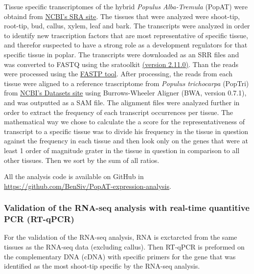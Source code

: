 \documentclass[
]{article}
\begin{document}
Tissue specific transcriptomes of the hybrid \emph{Populus Alba-Tremula}
(PopAT) were obtaind from
\href{https://www.ncbi.nlm.nih.gov/bioproject/?term=(Populus\%20tremula\%20x\%20alba,\%20clone\%20717\%20Transcriptome)\%20AND\%20bioproject_sra\%5Bfilter\%5D\%20NOT\%20bioproject_gap\%5Bfilter\%5D}{NCBI's
SRA site}. The tissues that were analyzed were shoot-tip, root-tip, bud,
callus, xylem, leaf and bark. The transcripts were analyzed in order to
identify new trascription factors that are most representative of
specific tissue, and therefor suspected to have a strong role as a
development regulators for that specific tissue in poplar. The
transcripts were downloaded as an SRR files and was converted to FASTQ
using the sratoolkit
\href{https://trace.ncbi.nlm.nih.gov/Traces/sra/sra.cgi?view=software}{(version
2.11.0)}. Than the reads were processed using the
\href{https://github.com/OpenGene/fastp}{FASTP tool}. After processing,
the reads from each tissue were aligned to a reference trascriptome from
\emph{Populus trichocarpa} (PopTri) from
\href{https://www.ncbi.nlm.nih.gov/datasets/genomes/?txid=3689\&term=Populus\&utm_source=gquery\&utm_medium=referral\&utm_campaign=:assemb}{NCBI's
Datasets site} using Burrows-Wheeler Aligner (BWA, version 0.7.1), and
was outputted as a SAM file. The alignment files were analyzed further
in order to extract the frequency of each transcript occurrences per
tissue. The mathematical way we chose to calculate the a score for the
representativeness of transcript to a specific tissue was to divide his
frequency in the tissue in question against the frequency in each tissue
and then look only on the genes that were at least 1 order of magnitude
grater in the tissue in question in comparison to all other tissues.
Then we sort by the sum of all ratios.

All the analysis code is available on GitHub in
\url{https://github.com/BenSiv/PopAT-expression-analysis}.

\hypertarget{validation-of-the-rna-seq-analysis-with-real-time-quantitive-pcr-rt-qpcr}{%
\subsubsection{Validation of the RNA-seq analysis with real-time
quantitive PCR
(RT-qPCR)}\label{validation-of-the-rna-seq-analysis-with-real-time-quantitive-pcr-rt-qpcr}}

For the validation of the RNA-seq analysis, RNA is exctarcted from the
same tissues as the RNA-seq data (excluding callus). Then RT-qPCR is
preformed on the complementary DNA (cDNA) with specific primers for the
gene that was identified as the most shoot-tip specific by the RNA-seq
analysis.
\end{document}
